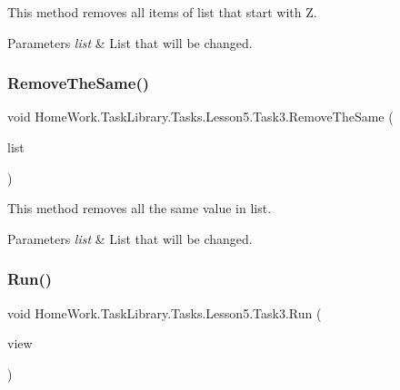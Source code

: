This method removes all items of list that start with \textquotesingle{}Z\textquotesingle{}. 


\begin{DoxyParams}{Parameters}
{\em list} & List that will be changed.\\
\hline
\end{DoxyParams}
\mbox{\label{class_home_work_1_1_task_library_1_1_tasks_1_1_lesson5_1_1_task3_a0f1e451c07d2d49f3449118bdbe1473a}} 
\subsubsection{\texorpdfstring{RemoveTheSame()}{RemoveTheSame()}}
{\footnotesize\ttfamily void Home\+Work.\+Task\+Library.\+Tasks.\+Lesson5.\+Task3.\+Remove\+The\+Same (\begin{DoxyParamCaption}\item[{List$<$ string $>$}]{list }\end{DoxyParamCaption})\hspace{0.3cm}{\ttfamily [private]}}



This method removes all the same value in list. 


\begin{DoxyParams}{Parameters}
{\em list} & List that will be changed.\\
\hline
\end{DoxyParams}
\mbox{\label{class_home_work_1_1_task_library_1_1_tasks_1_1_lesson5_1_1_task3_afd248844fad7e6015ea0ee3fc2a9be24}} 
\subsubsection{\texorpdfstring{Run()}{Run()}}
{\footnotesize\ttfamily void Home\+Work.\+Task\+Library.\+Tasks.\+Lesson5.\+Task3.\+Run (\begin{DoxyParamCaption}\item[{I\+Information}]{view }\end{DoxyParamCaption})}




